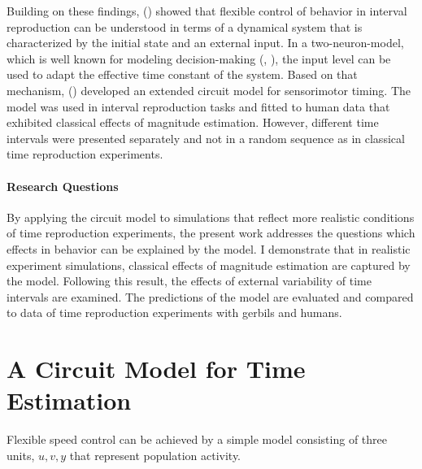 \documentclass[10pt]{article}
\begin{document}

Building on these findings, \citeauthor{Remington2018} (\citeyear{Remington2018}) showed that flexible control of behavior in interval reproduction can be understood in terms of a dynamical system that is characterized by the initial state and an external input.
 In a two-neuron-model, which is well known for modeling decision-making (\cite{Wang2002}, \cite{Roxin2008}), the input level can be used to adapt the effective time constant of the system.
Based on that mechanism, \citeauthor{Egger2020} (\citeyear{Egger2020}) developed an extended circuit model for sensorimotor timing.
The model was used in interval reproduction tasks and fitted to human data that exhibited classical effects of magnitude estimation. 
However, different time intervals were presented separately and not in a random sequence as in classical time reproduction experiments. 


\paragraph{Research Questions}
By applying the circuit model to simulations that reflect more realistic conditions of time reproduction experiments, the present work addresses the questions which effects in behavior can be explained by the model. 
I demonstrate that in realistic experiment simulations, classical effects of magnitude estimation are captured by the model.
Following this result, the effects of external variability of time intervals are examined. The predictions of the model are evaluated and compared to data of time reproduction experiments with gerbils and humans.


\section{A Circuit Model for Time Estimation}
Flexible speed control can be achieved by a simple model consisting of three units, $u, v, y$ that represent population activity. 
\end{document}
